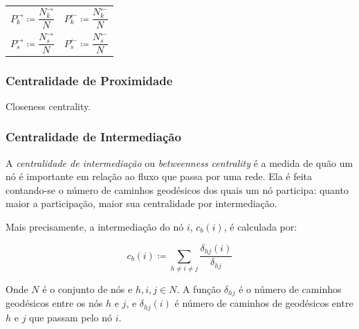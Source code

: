 \documentclass[12pt,a4paper]{article}
\theoremstyle{hypo}
\newcommand{\defn}{\coloneqq} %
\newcommand{\linkin}[1]{#1^\leftarrow} %
\newcommand{\linkout}[1]{#1^\rightarrow} %
\begin{document}
\noindent
\begin{tabularx}{\linewidth}{@{}XX@{}}
  \begin{equation} \label{eq:probabilidade-grau-saida}
  	\linkout{P}_k \defn \frac{\linkout{N}_k}{N}
  \end{equation} &
  \begin{equation} \label{eq:probabilidade-grau-entrada}
  	\linkin{P}_k \defn \frac{\linkin{N}_k}{N}
  \end{equation} \\
  \begin{equation} \label{eq:probabilidade-forca-saida}
  	\linkout{P}_s \defn \frac{\linkout{N}_s}{N}
  \end{equation} &
  \begin{equation} \label{eq:probabilidade-forca-entrada}
  	\linkin{P}_s \defn \frac{\linkin{N}_s}{N}
  \end{equation}
\end{tabularx}


\subsubsection{Centralidade de Proximidade}

Closeness centrality.

\subsubsection{Centralidade de Intermediação}

A \textit{centralidade de intermediação} ou \textit{betweenness centrality} é a medida de quão um nó é importante em relação ao fluxo que passa por uma rede. Ela é feita contando-se o número de caminhos geodésicos dos quais um nó participa: quanto maior a participação, maior sua centralidade por intermediação.

Mais precisamente, a intermediação do nó $i$, $c_b(i)$, é calculada por:

\begin{equation}
c_b(i) \defn \sum_{h \neq i \neq j} \frac{\delta_{hj}(i)}{\delta_{hj}}
\end{equation}

Onde $N$ é o conjunto de nós e $h, i, j \in N$. A função $\delta_{hj}$ é o número de caminhos geodésicos entre os nós $h$ e $j$, e $\delta_{hj}(i)$ é número de caminhos de geodésicos entre $h$ e $j$ que passam pelo nó $i$.
\end{document}
